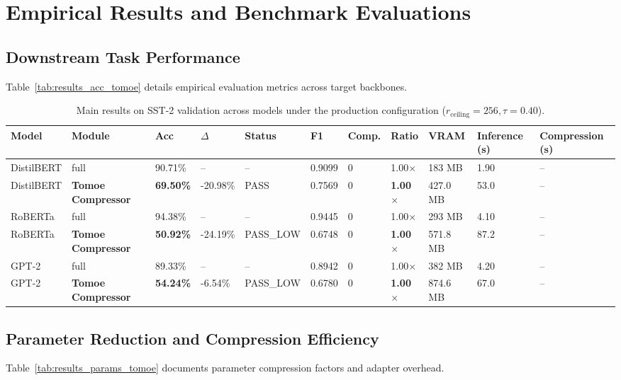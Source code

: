 \section{Empirical Results and Benchmark Evaluations}

\subsection{Downstream Task Performance}
Table~\ref{tab:results_acc_tomoe} details empirical evaluation metrics across target backbones.

\begin{table}[t]
\centering
\small
\begin{tabular}{lllllllllll}
\toprule
\textbf{Model} & \textbf{Module} & \textbf{Acc} & \textbf{$\Delta$} & \textbf{Status} & \textbf{F1} & \textbf{Comp.} & \textbf{Ratio} & \textbf{VRAM} & \textbf{Inference (s)} & \textbf{Compression (s)} \\
\midrule
DistilBERT & full & 90.71\% & -- & -- & 0.9099 & 0 & 1.00$\times$ & 183 MB & 1.90 & -- \\
DistilBERT & \textbf{Tomoe Compressor} & \textbf{69.50\%} & -20.98\% & PASS & 0.7569 & 0 & \textbf{1.00$\times$} & 427.0 MB & 53.0 & -- \\
RoBERTa & full & 94.38\% & -- & -- & 0.9445 & 0 & 1.00$\times$ & 293 MB & 4.10 & -- \\
RoBERTa & \textbf{Tomoe Compressor} & \textbf{50.92\%} & -24.19\% & PASS\_LOW & 0.6748 & 0 & \textbf{1.00$\times$} & 571.8 MB & 87.2 & -- \\
GPT-2 & full & 89.33\% & -- & -- & 0.8942 & 0 & 1.00$\times$ & 382 MB & 4.20 & -- \\
GPT-2 & \textbf{Tomoe Compressor} & \textbf{54.24\%} & -6.54\% & PASS\_LOW & 0.6780 & 0 & \textbf{1.00$\times$} & 874.6 MB & 67.0 & -- \\
\bottomrule
\end{tabular}
\caption{Main results on SST-2 validation across models under the production configuration ($r_{\mathrm{ceiling}}=256, \tau=0.40$).}
\label{tab:main_sst2}
\end{table}

\subsection{Parameter Reduction and Compression Efficiency}
Table~\ref{tab:results_params_tomoe} documents parameter compression factors and adapter overhead.

